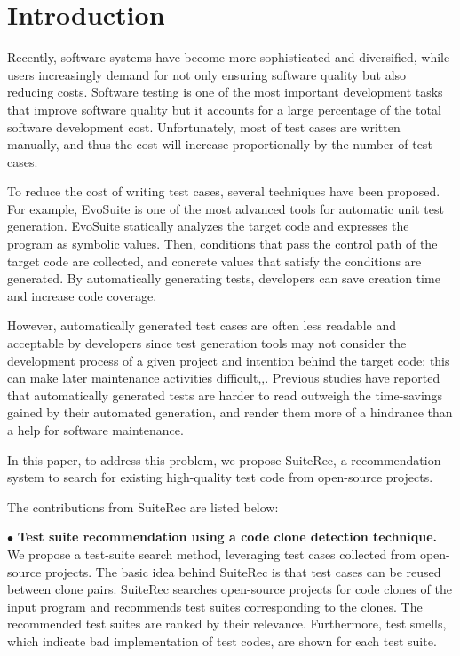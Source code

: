 \documentclass[conference]{IEEEtran}
\begin{document}
\section{Introduction}
Recently, software systems have become more sophisticated and diversified, while users increasingly demand for not only ensuring software quality but also reducing costs. Software testing is one of the most important development tasks that improve software quality but it accounts for a large percentage of the total software development cost\cite{b20}. Unfortunately, most of test cases are written manually, and thus the cost will increase proportionally by the number of test cases\cite{b19}. 

To reduce the cost of writing test cases, several techniques have been proposed. 
For example, EvoSuite\cite{b3} is one of the most advanced tools for automatic unit test generation. EvoSuite statically analyzes the target code and expresses the program as symbolic values. Then, conditions that pass the control path of the target code are collected, and concrete values that satisfy the conditions are generated. By automatically generating tests, developers can save creation time and increase code coverage. 

However, automatically generated test cases are often less readable and acceptable by developers since test generation tools may not consider the development process of a given project and intention behind the target code; this can make later maintenance activities difficult\cite{b13},\cite{b14},\cite{b15}. 
Previous studies have reported that automatically generated tests are harder to read outweigh the time-savings gained by their automated generation, and render them more of a hindrance than a help for software maintenance\cite{b1}.

In this paper, to address this problem, we propose {\sf SuiteRec}, a recommendation system to search for existing high-quality test code from open-source projects. 

The contributions from \textsf{SuiteRec} are listed below:

\noindent
$\bullet$ \textbf{Test suite recommendation using a code clone detection technique.} We propose a test-suite search method, leveraging test cases collected from open-source projects. The basic idea behind \textsf{SuiteRec} is that test cases can be reused between clone pairs. \textsf{SuiteRec} searches open-source projects for code clones of the input program and recommends test suites corresponding to the clones. The recommended test suites are ranked by their relevance. Furthermore, test smells, which indicate bad implementation of test codes, are shown for each test suite.
\end{document}

